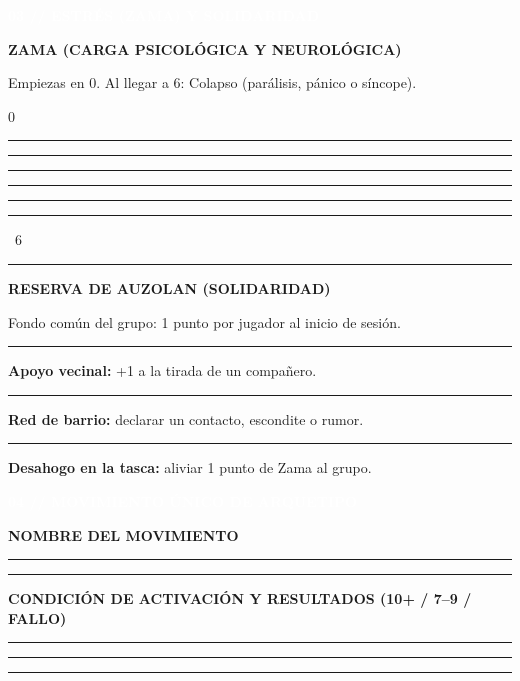\documentclass[10pt,a4paper,oneside]{book}
\newcommand{\rulefield}[2][\linewidth]{%
  \begin{minipage}[t]{#1}
  \textcolor{InkSoft}{\industrialfont\scriptsize\bfseries\MakeUppercase{#2}}\par
  \vspace{0.8mm}\textcolor{Line}{\rule{\linewidth}{0.45pt}}
  \end{minipage}}
\newcommand{\strip}[1]{%
  \vspace{0.8mm}\noindent
  \colorbox{CarbonDark}{\parbox{\dimexpr\linewidth-2\fboxsep\relax}{%
    \textcolor{white}{\industrialfont\bfseries\small\MakeUppercase{#1}}}}\par
  \vspace{0.8mm}}
\newcommand{\checkline}[2]{%
  \textcolor{#1}{\rule{2.4mm}{2.4mm}}\hspace{1mm}\textcolor{InkSoft}{\scriptsize #2}}
\begin{document}
\begin{minipage}[t]{0.48\linewidth}
  \strip{03 // Estrés (Zama) y solidaridad}
  \begin{tcolorbox}[enhanced,colback=GoldPale,colframe=GoldDark,boxrule=.6pt,
    arc=0.8mm,left=4pt,right=4pt,top=2.5pt,bottom=2.5pt,height=44mm]
    {\industrialfont\bfseries\color{GoldDark}ZAMA (CARGA PSICOLÓGICA Y NEUROLÓGICA)}\par
    \textcolor{InkSoft}{\scriptsize Empiezas en 0. Al llegar a 6: Colapso (parálisis, pánico o síncope).}\par
    \vspace{2mm}
    \begin{center}
      \textcolor{InkSoft}{\scriptsize 0}\quad
      \checkline{AcidSirimiri}{}\quad
      \checkline{AcidSirimiri}{}\quad
      \checkline{AcidSirimiri}{}\quad
      \checkline{AcidSirimiri}{}\quad
      \checkline{AcidSirimiri}{}\quad
      \textcolor{OrekakRust}{\rule{2.8mm}{2.8mm}}\ \textcolor{OrekakRust}{\scriptsize 6}
    \end{center}
    \vspace{0.5mm}\textcolor{Line}{\rule{\linewidth}{.4pt}}\vspace{1mm}
    {\industrialfont\bfseries\color{GoldDark}RESERVA DE AUZOLAN (SOLIDARIDAD)}\par
    \textcolor{InkSoft}{\scriptsize Fondo común del grupo: 1 punto por jugador al inicio de sesión.}\par
    \vspace{0.5mm}
    {\color{InkSoft}\scriptsize
      \checkline{GoldDark}{} \textbf{Apoyo vecinal:} +1 a la tirada de un compañero.\par\vspace{0.8mm}
      \checkline{GoldDark}{} \textbf{Red de barrio:} declarar un contacto, escondite o rumor.\par\vspace{0.8mm}
      \checkline{GoldDark}{} \textbf{Desahogo en la tasca:} aliviar 1 punto de Zama al grupo.}
  \end{tcolorbox}
\end{minipage}

\strip{04 // Movimiento único de arquetipo}

\begin{tcolorbox}[enhanced,colback=RustPale,colframe=OrekakRust,boxrule=.6pt,
  arc=0.8mm,left=5pt,right=5pt,top=2.5pt,bottom=2.5pt]
  \begin{minipage}[t]{0.32\linewidth}
    \rulefield{Nombre del movimiento}\par\vspace{2mm}
    \textcolor{Line}{\rule{\linewidth}{.4pt}}
  \end{minipage}\hfill
  \begin{minipage}[t]{0.62\linewidth}
    \rulefield{Condición de activación y resultados (10+ / 7--9 / Fallo)}\par\vspace{2mm}
    \textcolor{Line}{\rule{\linewidth}{.4pt}}\par\vspace{2mm}
    \textcolor{Line}{\rule{\linewidth}{.4pt}}
  \end{minipage}
\end{tcolorbox}
\end{document}
